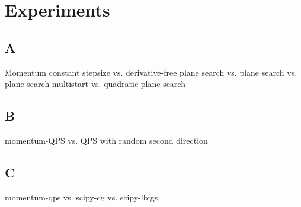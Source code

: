 \documentclass[a4paper, 11pt, openany]{article}
\theoremstyle{plain}%
\theoremstyle{definition}
\begin{document}
	
	
	\section{Experiments}
	\subsection{A}
	Momentum constant stepsize vs. derivative-free plane search vs. plane search vs. plane search multistart vs. quadratic plane search
	\subsection{B}
	momentum-QPS vs. QPS with random second direction
	\subsection{C}
	momentum-qps vs. scipy-cg vs. scipy-lbfgs
	
	
	 
	
	
	
	
	
\end{document}
